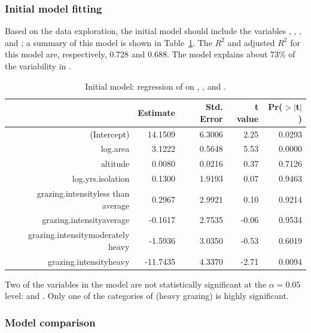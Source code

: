 \subsubsection{Initial model fitting}

Based on the data exploration, the initial model should include the variables , , , and ; a summary of this model is shown in Table~\ref{forestbirdsAbunLogAreaAltLogIsolGrazingIntensityRegress}. The $R^2$ and adjusted $R^2$ for this model are, respectively, 0.728 and 0.688.  The model explains about 73\% of the variability in .  

\begin{table}[ht]
\centering
\begin{tabular}{rrrrr}
  \hline
 & Estimate & Std. Error & t value & Pr($>$$|$t$|$) \\ 
  \hline
(Intercept) & 14.1509 & 6.3006 & 2.25 & 0.0293 \\ 
  log.area & 3.1222 & 0.5648 & 5.53 & 0.0000 \\ 
  altitude & 0.0080 & 0.0216 & 0.37 & 0.7126 \\ 
  log.yrs.isolation & 0.1300 & 1.9193 & 0.07 & 0.9463 \\ 
  grazing.intensityless than average & 0.2967 & 2.9921 & 0.10 & 0.9214 \\ 
  grazing.intensityaverage & -0.1617 & 2.7535 & -0.06 & 0.9534 \\ 
  grazing.intensitymoderately heavy & -1.5936 & 3.0350 & -0.53 & 0.6019 \\ 
  grazing.intensityheavy & -11.7435 & 4.3370 & -2.71 & 0.0094 \\ 
   \hline
\end{tabular}
\caption{Initial model: regression of  on , ,  and .}
\label{forestbirdsAbunLogAreaAltLogIsolGrazingIntensityRegress}
\end{table}

Two of the variables in the model are not statistically significant at the $\alpha = 0.05$ level:  and . Only one of the categories of  (heavy grazing) is highly significant.

\subsubsection{Model comparison}


